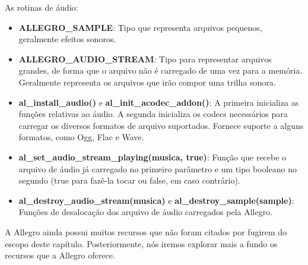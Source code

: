 \documentclass[a4paper,12pt]{report}
\begin{document}
% 
As rotinas de áudio:
%
\begin{itemize}
 \item \textbf{ALLEGRO\_SAMPLE}: Tipo que representa arquivos pequenos, geralmente efeitos sonoros.
 \item \textbf{ALLEGRO\_AUDIO\_STREAM}: Tipo para representar arquivos grandes, de forma que o arquivo não é carregado de uma vez para a 
 memória. Geralmente representa os arquivos que irão compor uma trilha sonora.
 \item \textbf{al\_install\_audio()} e \textbf{al\_init\_acodec\_addon()}: A primeira inicializa as funções relativas ao áudio. A segunda inicializa os 
 codecs necessários para carregar os diversos formatos de arquivo suportados. Fornece suporte a alguns formatos, como Ogg, Flac e Wave.
 \item \textbf{al\_set\_audio\_stream\_playing(musica, true)}: Função que recebe o arquivo de áudio já carregado no primeiro parâmetro e um tipo 
 booleano no segundo (true para fazê-la tocar ou false, em caso contrário).
 \item \textbf{al\_destroy\_audio\_stream(musica) } e \textbf{al\_destroy\_sample(sample)}: Funções de desalocação dos arquivo de áudio carregados 
 pela Allegro.
\end{itemize}
%
%
A Allegro ainda possui muitos recursos que não foram citados por fugirem do escopo deste capítulo. Posteriormente,
nós iremos explorar mais a fundo os recursos que a Allegro oferece.
%
%
\end{document}
